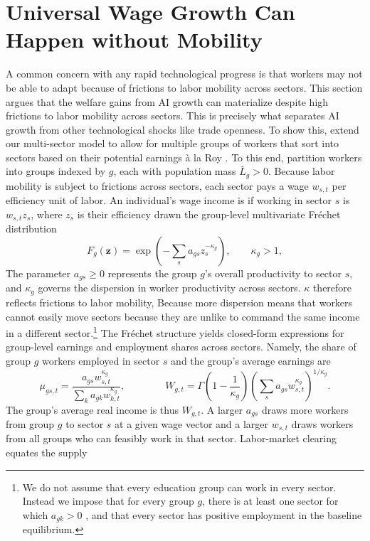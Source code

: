 \documentclass[11pt]{article}
\begin{document}
\section{ Universal Wage Growth Can Happen without Mobility}\label{sec:heterogeneity}

A common concern with any rapid technological progress is that workers
may not be able to adapt because of frictions to labor mobility across
sectors. This section argues that the welfare gains from AI growth
can materialize despite high frictions to labor mobility across sectors.
This is precisely what separates AI growth from other technological
shocks like trade openness. To show this, extend our multi-sector
model to allow for multiple groups of workers that sort into sectors
based on their potential earnings \`a la  Roy \citep{cv2015,gry2023}.
To this end, partition workers into groups indexed by $g$, each with
population mass $\bar{L}_{g}>0$. Because labor mobility is subject
to frictions across sectors, each sector pays a wage $w_{s,t}$ per
efficiency unit of labor. An individual's wage income is if working
in sector $s$ is $w_{s,t}z_{s}$, where $z_{s}$ is their efficiency
drawn the group-level multivariate Fréchet distribution
\[
F_{g}(\mathbf{z})=\exp\!\left(-\sum_{s}a_{gs}z^{-\kappa_{g}}_{s}\right),\qquad\kappa_{g}>1,
\]
The parameter $a_{gs}\geq0$ represents the group $g$'s overall productivity
to sector $s$, and $\kappa_{g}$ governs the dispersion in worker
productivity across sectors. $\kappa$ therefore reflects frictions
to labor mobility, Because more dispersion means that workers cannot
easily move sectors because they are unlike to command the same income
in a different sector.\footnote{We do not assume that every education group can work in every sector.
Instead we impose that for every group $g$, there is at least one
sector for which $a_{gk}>0$ , and that every sector has positive
employment in the baseline equilibrium.} The Fréchet structure yields closed-form expressions for group-level
earnings and employment shares across sectors. Namely, the share of
group $g$ workers employed in sector $s$ and the group's average
earnings are
\[
\mu_{gs,t}=\frac{a_{gs}w^{\kappa_{g}}_{s,t}}{\sum_{k}a_{gk}w^{\kappa_{g}}_{k,t}},\qquad\qquad W_{g,t}=\Gamma\!\left(1-\frac{1}{\kappa_{g}}\right)\left(\sum_{s}a_{gs}w^{\kappa_{g}}_{s,t}\right)^{1/\kappa_{g}}.
\]
The group's average real income is thus $W_{g,t}$. A larger $a_{gs}$
draws more workers from group $g$ to sector $s$ at a given wage
vector and a larger $w_{s,t}$ draws workers from all groups who can
feasibly work in that sector. Labor-market clearing equates the supply
\end{document}
